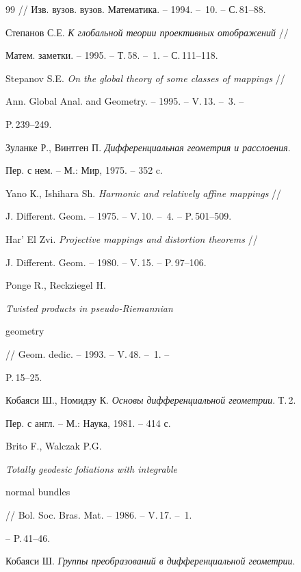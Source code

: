 \begin{thebibliography}{99}
// Изв. вузов. вузов. Математика. -- 1994. -- \No\,10. -- С.\,81--88. 




Степанов С.Е. {\em К глобальной теории проективных отображений} // 


Матем. заметки. -- 1995. -- Т.\,58. -- \No\,1. -- С.\,111--118. 




Stepanov S.E. {\em On the global theory of some classes of mappings} // 


Ann. Global Anal. and Geometry. -- 1995. -- V.\,13. -- \No\,3. -- 


P.\,239--249. 




Зуланке Р., Винтген П. {\em Дифференциальная геометрия и расслоения}. 


Пер. с нем. -- М.: Мир, 1975. -- 352 c. 




Yano К., Ishihara Sh. {\em Harmonic and relatively affine mappings} // 


J. Different. Geom. -- 1975. -- V.\,10. -- \No\,4. -- P.\,501--509. 




Har' El Zvi. {\em Projective mappings and distortion theorems} // 


J. Different. Geom. -- 1980. -- V.\,15. -- P.\,97--106. 




Ponge R., Reckziegel H. {\em Twisted products in pseudo-Riemannian 


geometry} // Geom. dedic. -- 1993. -- V.\,48. -- \No\,1. -- 


P.\,15--25. 




Кобаяси Ш., Номидзу К. {\em Основы дифференциальной геометрии}. Т.\,2. 


Пер. с англ. -- М.: Наука, 1981. -- 414 с. 




Brito F., Walczak P.G. {\em Totally geodesic foliations with integrable 


normal bundles} // Bol. Soc. Bras. Mat. -- 1986. -- V.\,17. -- \No\,1. 


-- P.\,41--46. 




Кобаяси Ш. {\em Группы преобразований в дифференциальной геометрии}. 



\end{thebibliography}
